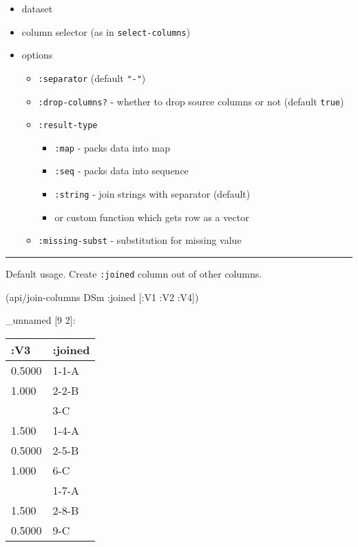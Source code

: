 \documentclass[]{article}
\newenvironment{Shaded}{\begin{snugshade}}{\end{snugshade}}
\newcommand{\AttributeTok}[1]{\textcolor[rgb]{0.77,0.63,0.00}{#1}}
\newcommand{\NormalTok}[1]{#1}
\providecommand{\tightlist}{%
  \setlength{\itemsep}{0pt}\setlength{\parskip}{0pt}}
\begin{document}
\begin{itemize}
\tightlist
\item
  dataset
\item
  column selector (as in \texttt{select-columns})
\item
  options

  \begin{itemize}
  \tightlist
  \item
    \texttt{:separator} (default \texttt{"-"})
  \item
    \texttt{:drop-columns?} - whether to drop source columns or not
    (default \texttt{true})
  \item
    \texttt{:result-type}

    \begin{itemize}
    \tightlist
    \item
      \texttt{:map} - packs data into map
    \item
      \texttt{:seq} - packs data into sequence
    \item
      \texttt{:string} - join strings with separator (default)
    \item
      or custom function which gets row as a vector
    \end{itemize}
  \item
    \texttt{:missing-subst} - substitution for missing value
  \end{itemize}
\end{itemize}

\begin{center}\rule{0.5\linewidth}{0.5pt}\end{center}

Default usage. Create \texttt{:joined} column out of other columns.

\begin{Shaded}
\begin{Highlighting}[]
\NormalTok{(api/join-columns DSm }\AttributeTok{:joined}\NormalTok{ [}\AttributeTok{:V1} \AttributeTok{:V2} \AttributeTok{:V4}\NormalTok{])}
\end{Highlighting}
\end{Shaded}

\_unnamed {[}9 2{]}:

\begin{longtable}[]{@{}ll@{}}
\toprule
:V3 & :joined\tabularnewline
\midrule
\endhead
0.5000 & 1-1-A\tabularnewline
1.000 & 2-2-B\tabularnewline
& 3-C\tabularnewline
1.500 & 1-4-A\tabularnewline
0.5000 & 2-5-B\tabularnewline
1.000 & 6-C\tabularnewline
& 1-7-A\tabularnewline
1.500 & 2-8-B\tabularnewline
0.5000 & 9-C\tabularnewline
\bottomrule
\end{longtable}
\end{document}
